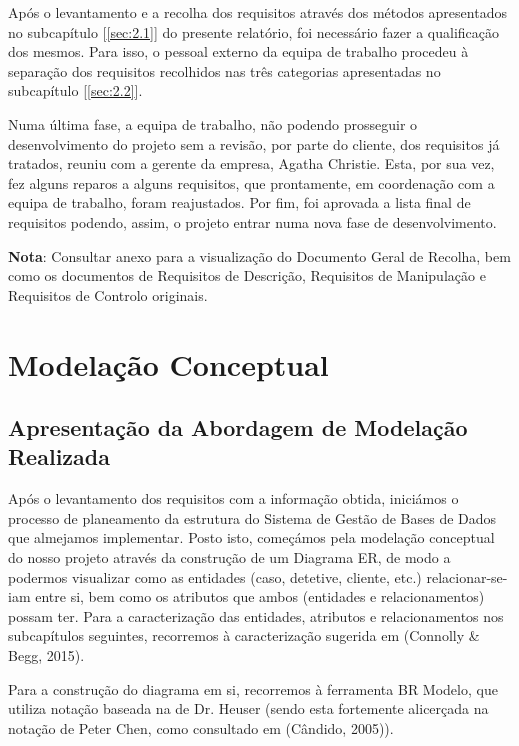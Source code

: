 \documentclass[a4paper,12pt]{scrreprt}
\begin{document}
        Após o levantamento e a recolha dos requisitos através dos métodos apresentados no subcapítulo [\ref{sec:2.1}] do presente relatório, foi necessário fazer a qualificação dos mesmos. Para isso, o pessoal externo da equipa de trabalho procedeu à separação dos requisitos recolhidos nas três categorias apresentadas no subcapítulo [\ref{sec:2.2}].
        
        Numa última fase, a equipa de trabalho, não podendo prosseguir o desenvolvimento do projeto sem a revisão, por parte do cliente, dos requisitos já tratados, reuniu com a gerente da empresa, Agatha Christie. Esta, por sua vez, fez alguns reparos a alguns requisitos, que prontamente, em coordenação com a equipa de trabalho, foram reajustados. Por fim, foi aprovada a lista final de requisitos podendo, assim, o projeto entrar numa nova fase de desenvolvimento.

        \textbf{Nota}: Consultar anexo  para a visualização do Documento Geral de Recolha, bem como os documentos de Requisitos de Descrição, Requisitos de Manipulação e Requisitos de Controlo originais.



\chapter{Modelação Conceptual}
    \section{Apresentação da Abordagem de Modelação Realizada}
        {
            Após o levantamento dos requisitos com a informação obtida, iniciámos o processo de planeamento da estrutura do Sistema de Gestão de Bases de Dados que almejamos implementar.
            Posto isto, começámos pela modelação conceptual do nosso projeto através da construção de um Diagrama ER, de modo a podermos visualizar como as entidades (caso, detetive, cliente, etc.) relacionar-se-iam entre si, bem como os atributos que ambos (entidades e relacionamentos) possam ter. Para a caracterização das entidades, atributos e relacionamentos nos subcapítulos seguintes, recorremos à caracterização sugerida em  \cite{DatabaseSystems} (Connolly \& Begg, 2015).

            Para a construção do diagrama em si, recorremos à ferramenta BR Modelo, que utiliza notação baseada na de Dr. Heuser (sendo esta fortemente alicerçada na notação de Peter Chen, como consultado em \cite{Aprendizagem em Banco de Dados} (Cândido, 2005)).
        }
\end{document}
